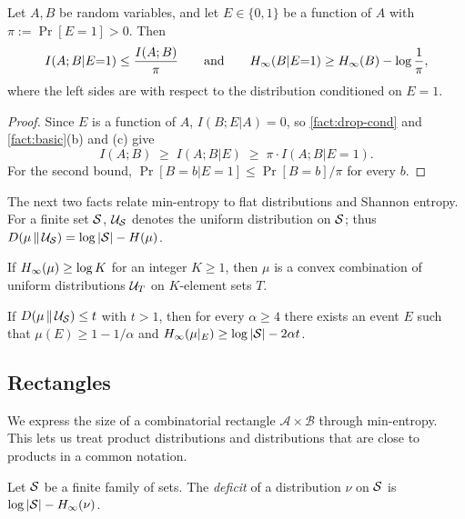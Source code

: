 \begin{fact}\label{fact:one-side}
Let $A, B$ be random variables, and let $E \in \{0,1\}$ be a function of $A$ with $\pi := \Pr[E = 1] > 0$. Then
\[ I(A; B | E {=} 1) \le \frac{I(A; B)}{\pi} \qquad\text{and}\qquad H_\infty(B | E {=} 1) \ge H_\infty(B) - \log\frac1\pi, \]
where the left sides are with respect to the distribution conditioned on $E = 1$.
\end{fact}
\begin{proof}
Since $E$ is a function of $A$, $I(B; E | A) = 0$, so \cref{fact:drop-cond} and \cref{fact:basic}(b) and (c) give
\[ I(A; B) \;\ge\; I(A; B | E) \;\ge\; \pi \cdot I(A; B | E {=} 1). \]
For the second bound, $\Pr[B = b | E = 1] \le \Pr[B = b]/\pi$ for every $b$.
\end{proof}

\noindent The next two facts relate min-entropy to flat distributions and Shannon entropy. For a finite set $\mathcal{S}$, $\mathcal{U}_{\mathcal{S}}$ denotes the uniform distribution on $\mathcal{S}$; thus $D(\mu \,\|\, \mathcal{U}_{\mathcal{S}}) = \log\left|\mathcal{S}\right| - H(\mu)$.

\begin{fact}\label{fact:flat}
If $H_\infty(\mu) \ge \log K$ for an integer $K \ge 1$, then $\mu$ is a convex combination of uniform distributions $\mathcal{U}_{T}$ on $K$-element sets $T$.
\end{fact}

\begin{fact}\label{fact:smooth}
If $D(\mu \,\|\, \mathcal{U}_{\mathcal{S}}) \le t$ with $t > 1$, then for every $\alpha \ge 4$ there exists an event $E$ such that $\mu(E) \ge 1 - 1/\alpha$ and $H_\infty(\mu|_E) \ge \log\left|\mathcal{S}\right| - 2\alpha t$.
\end{fact}

\subsection{Rectangles}\label{sec:prelim-rect}

We express the size of a combinatorial rectangle $\mathcal{A}\times\mathcal{B}$ through min-entropy. This lets us treat product distributions and distributions that are close to products in a common notation.

\begin{definition}[Deficit]\label{def:deficit}
Let $\mathcal{S}$ be a finite family of sets. The \emph{deficit} of a distribution $\nu$ on $\mathcal{S}$ is $\log\left|\mathcal{S}\right| - H_\infty(\nu)$.
\end{definition}

